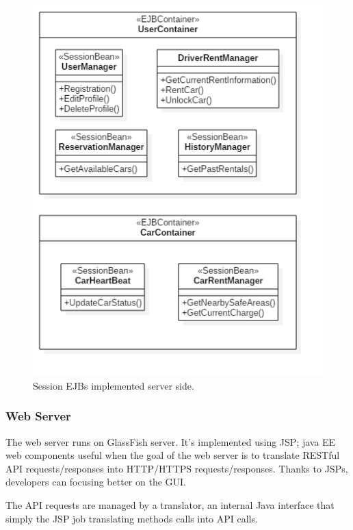 \begin{figure}[H]
	\centering
	\includegraphics[width=\textwidth, keepaspectratio]{diagrams/SEJBs.png}
	\caption{Session EJBs implemented server side.}
	\label {fig:session-beans}
\end{figure}

\subsubsection{Web Server}

The web server runs on GlassFish server. It's implemented using JSP; java EE web components useful when the goal of the web server is to translate RESTful API requests/responses into  HTTP/HTTPS requests/responses. Thanks to JSPs, developers can focusing better on the GUI.

The API requests are managed by a translator, an internal Java interface that simply the JSP job translating methods calls into API calls.


